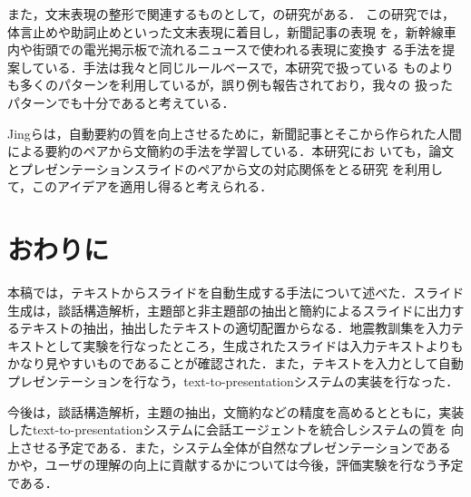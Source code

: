 また，文末表現の整形で関連するものとして，\cite{Yamamoto05}の研究がある．
この研究では，体言止めや助詞止めといった文末表現に着目し，新聞記事の表現
を，新幹線車内や街頭での電光掲示板で流れるニュースで使われる表現に変換す
る手法を提案している．手法は我々と同じルールベースで，本研究で扱っている
ものよりも多くのパターンを利用しているが，誤り例も報告されており，我々の
扱ったパターンでも十分であると考えている．

Jingらは，自動要約の質を向上させるために，新聞記事とそこから作られた人間
による要約のペアから文簡約の手法を学習している\cite{Jing00}．本研究にお
いても，論文とプレゼンテーションスライドのペアから文の対応関係をとる研究
\cite{Hayama05}を利用して，このアイデアを適用し得ると考えられる．


\section{おわりに}

\label{sec:conclusion}

本稿では，テキストからスライドを自動生成する手法について述べた．スライド
生成は，談話構造解析，主題部と非主題部の抽出と簡約によるスライドに出力す
るテキストの抽出，抽出したテキストの適切配置からなる．地震教訓集を入力テ
キストとして実験を行なったところ，生成されたスライドは入力テキストよりも
かなり見やすいものであることが確認された．また，テキストを入力として自動
プレゼンテーションを行なう，text-to-presentationシステムの実装を行なった．

今後は，談話構造解析，主題の抽出，文簡約などの精度を高めるとともに，実装
したtext-to-presentationシステムに会話エージェントを統合しシステムの質を
向上させる予定である．また，システム全体が自然なプレゼンテーションである
かや，ユーザの理解の向上に貢献するかについては今後，評価実験を行なう予定
である．


